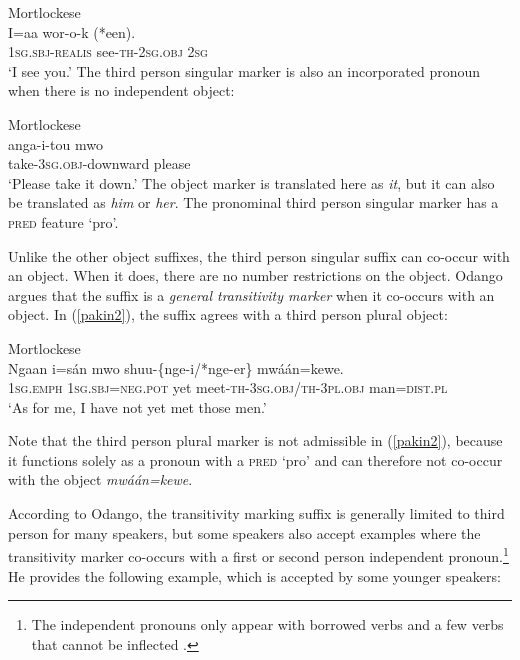 \documentclass[output=paper,hidelinks]{langscibook}
\begin{document}
 \newpage
 
 \ea   \label{pakin1}Mortlockese\\
 \gll I=aa wor-o-k (*een). \\
   \textsc{1sg.sbj-realis} see-\textsc{th-2sg.obj} \textsc{2sg}  \\
 \glt `I see you.'
 \z
The third person singular marker is  also an incorporated pronoun   when there is no independent object:
  
 \ea   \label{pakin0}Mortlockese\\
 \gll  anga-i-tou mwo \\
  take-3\textsc{sg.obj}-downward please  \\
 \glt `Please take it down.'
 \z
The   object marker is translated here as \textit{it}, but it can also be  translated as \textit{him} or \textit{her}.  The pronominal third person singular marker has a \textsc{pred} feature `pro'. 
  
Unlike the other object suffixes, the  third person singular   suffix  can   co-occur with an object.  When it does, there are no   number  restrictions on the object.    Odango argues that the suffix is a  \textit{general transitivity marker} when it co-occurs with an object.    In (\ref{pakin2}),  the suffix agrees with a third person plural object:
 
 
\ea   \label{pakin2} Mortlockese\\
\gll  Ngaan i=sán mwo shuu-\{nge-i/*nge-er\} mwáán=kewe. \\
 \textsc{1sg.emph} \textsc{1sg.sbj=neg.pot} yet meet-\textsc{th-3sg.obj/th-3pl.obj} man=\textsc{dist.pl}  \\
 \glt `As for me, I have not yet met those men.'
  \z
  
 \noindent    Note that the third person plural marker is not admissible in (\ref{pakin2}), because it functions solely as a pronoun with a \textsc{pred} `pro' and can therefore not  co-occur with  the object  \textit{mwáán=kewe}.
 
 According to Odango, the transitivity marking suffix is generally limited to third person for many speakers, but some speakers also accept examples  where the transitivity marker co-occurs with a first or second person independent pronoun.\footnote{The independent pronouns only appear  with  borrowed verbs and a few verbs that  cannot be inflected \citep{odango2014}.}  He provides the   following example, which is accepted by some  younger speakers:
 
 
 \newpage
\end{document}
